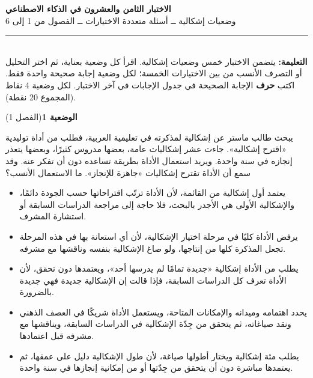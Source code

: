 \documentclass[11pt,a4paper]{article}
\begin{document}
\linespread{1.08}\selectfont
\begin{center}
{\LARGE\khatt\textbf{الاختبار الثامن والعشرون في الذكاء الاصطناعي}}\\[4pt]
{\normalsize وضعيات إشكالية ــ أسئلة متعددة الاختيارات ــ الفصول من 1 إلى 6}
\end{center}
\vspace{-2pt}\rule{\textwidth}{0.6pt}\\[2pt]
\textbf{التعليمة:} يتضمن الاختبار خمس وضعيات إشكالية. اقرأ كل وضعية بعناية، ثم اختر التحليل أو التصرف الأنسب
من بين الاختيارات الخمسة؛ لكل وضعية إجابة صحيحة واحدة فقط.
اكتب \textbf{حرف} الإجابة الصحيحة في جدول الإجابات في آخر الاختبار.
لكل وضعية 4 نقاط (المجموع 20 نقطة).
\vspace{4pt}

\noindent
{\large\khatt\textbf{الوضعية 1}}\hfill{\small(الفصل 1)}\par\nopagebreak\vspace{3pt}
\setlength{\fboxsep}{7pt}\colorbox{gray!10}{\parbox{\dimexpr\linewidth-14pt}{يبحث طالب ماستر عن إشكالية لمذكرته في تعليمية العربية، فطلب من أداة توليدية «اقترح إشكالية». جاءت عشر إشكاليات عامة، بعضها مدروس كثيرًا، وبعضها يتعذر إنجازه في سنة واحدة. ويريد استعمال الأداة بطريقة تساعده دون أن تفكر عنه. وقد سمع أن الأداة تقترح إشكاليات «جاهزة للإنجاز». ما الاستعمال الأنسب؟}}\par\nopagebreak
\begin{itemize}[leftmargin=1.0cm, labelsep=6pt, itemsep=3pt, topsep=4pt, parsep=0pt]
  \item[\textbf{أ)}] يعتمد أول إشكالية من القائمة، لأن الأداة ترتّب اقتراحاتها حسب الجودة دائمًا، والإشكالية الأولى هي الأجدر بالبحث، فلا حاجة إلى مراجعة الدراسات السابقة أو استشارة المشرف.
  \item[\textbf{ب)}] يرفض الأداة كليًا في مرحلة اختيار الإشكالية، لأن أي استعانة بها في هذه المرحلة تجعل المذكرة كلها من إنتاجها، ولو صاغ الإشكالية بنفسه وناقشها مع مشرفه.
  \item[\textbf{ج)}] يطلب من الأداة إشكالية «جديدة تمامًا لم يدرسها أحد»، ويعتمدها دون تحقق، لأن الأداة تعرف كل الدراسات السابقة، فإذا قالت إن الإشكالية جديدة فهي جديدة بالضرورة.
  \item[\textbf{د)}] يحدد اهتمامه وميدانه والإمكانات المتاحة، ويستعمل الأداة شريكًا في العصف الذهني ونقد صياغاته، ثم يتحقق من جِدّة الإشكالية في الدراسات السابقة، ويناقشها مع مشرفه قبل اعتمادها.
  \item[\textbf{هـ)}] يطلب مئة إشكالية ويختار أطولها صياغة، لأن طول الإشكالية دليل على عمقها، ثم يعتمدها مباشرة دون أن يتحقق من جِدّتها أو من إمكانية إنجازها في سنة واحدة.
\end{itemize}
\end{document}
